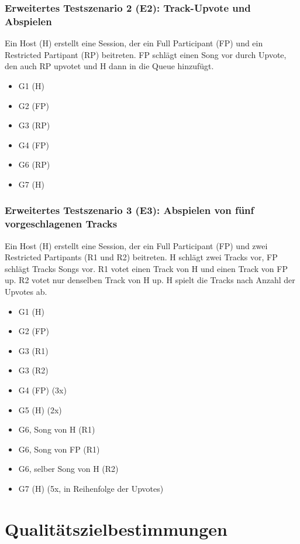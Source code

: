 \documentclass[oneside, ngerman]{sdqtechreport}
\begin{document}
\subsection{Erweitertes Testszenario 2 (E2): Track-Upvote und Abspielen}
\label{subsec:Tests:ErweiterteTestszenarien:E1}
Ein Host (H) erstellt eine Session, der ein Full Participant (FP) und ein Restricted Partipant (RP) beitreten. FP schlägt einen Song vor durch Upvote, den auch RP upvotet und H dann in die Queue hinzufügt.
\begin{itemize}
    \item G1 (H)
    \item G2 (FP)
    \item G3 (RP)
    \item G4 (FP)
    \item G6 (RP)
    \item G7 (H)
\end{itemize}


\subsection{Erweitertes Testszenario 3 (E3): Abspielen von fünf vorgeschlagenen Tracks}
\label{subsec:Tests:ErweiterteTestszenarien:E3}
Ein Host (H) erstellt eine Session, der ein Full Participant (FP) und zwei Restricted Partipants (R1 und R2) beitreten. H schlägt zwei Tracks vor, FP schlägt Tracks Songs vor. R1 votet einen Track von H und einen Track von FP up. R2 votet nur denselben Track von H up. H spielt die Tracks nach Anzahl der Upvotes ab.
\begin{itemize}
    \item G1 (H)
    \item G2 (FP)
    \item G3 (R1)
    \item G3 (R2)
    \item G4 (FP) (3x)
    \item G5 (H) (2x)
    \item G6, Song von H (R1)
    \item G6, Song von FP (R1)
    \item G6, selber Song von H (R2)
    \item G7 (H) (5x, in Reihenfolge der Upvotes)
\end{itemize}


\chapter{Qualitätszielbestimmungen}
\label{chap:Qualitätszielbestimmungen}
\end{document}
